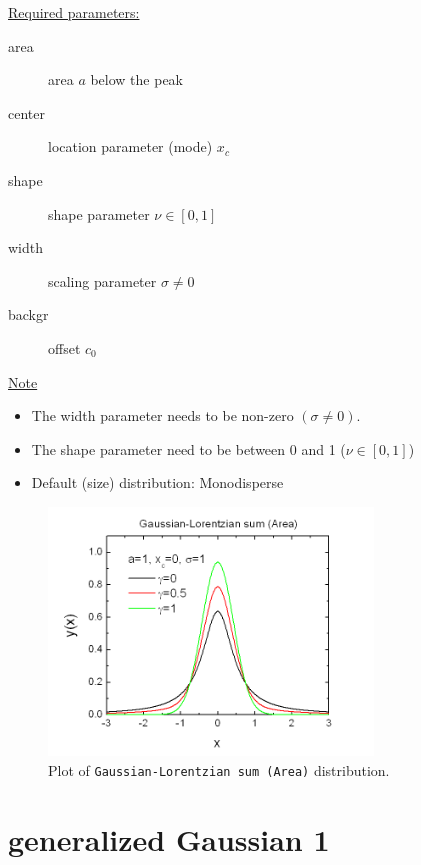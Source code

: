 \underline{Required parameters:}
\begin{description}
    \item[area] area $a$ below the peak
    \item[center] location parameter (mode) $x_c$
    \item[shape] shape parameter $\nu\in [0,1]$
    \item[width] scaling parameter $\sigma \neq 0$
    \item[backgr] offset $c_0$
\end{description}

\underline{Note}
\begin{itemize}
  \item The width parameter needs to be non-zero $(\sigma\neq 0)$.
  \item The shape parameter need to be between 0 and 1 ($\nu\in [0,1]$)
  \item Default (size) distribution: Monodisperse
\end{itemize}
\begin{figure}[htb]
\begin{center}
\includegraphics[width=0.768\textwidth]{GaussianLorentzianSumArea.png}
\end{center}
\caption{Plot of \texttt{Gaussian-Lorentzian sum (Area)} distribution.}
\label{fig:GaussianLorentzianSumArea}
\end{figure}

\clearpage
\section{generalized Gaussian 1} ~\\
\label{sec:generalizedGaussian1}

